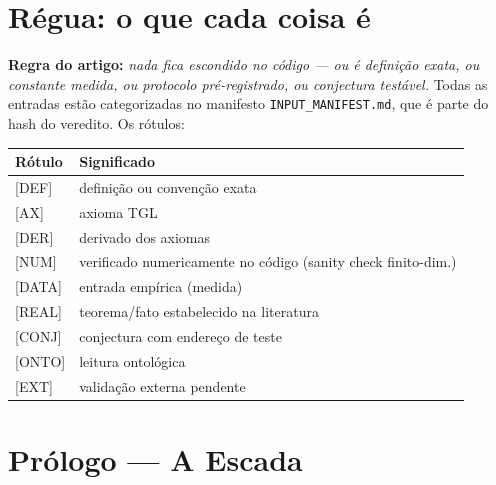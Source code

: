 \documentclass[11pt]{article}
\theoremstyle{definition}\newtheorem{deriv}{Derivação}
\begin{document}
\clearpage\tableofcontents\clearpage

\section*{Régua: o que cada coisa é}

\noindent\textbf{Regra do artigo:} \emph{nada fica escondido no código --- ou é definição exata, ou constante medida, ou protocolo pré-registrado, ou conjectura testável.} Todas as entradas estão categorizadas no manifesto \texttt{INPUT\_MANIFEST.md}, que é parte do hash do veredito. Os rótulos:

\begin{center}\small\begin{tabular}{ll}\toprule

Rótulo & Significado\\\midrule

\textsf{[DEF]} & definição ou convenção exata\\

\textsf{[AX]} & axioma TGL\\

\textsf{[DER]} & derivado dos axiomas\\

\textsf{[NUM]} & verificado numericamente no código (sanity check finito-dim.)\\

\textsf{[DATA]} & entrada empírica (medida)\\

\textsf{[REAL]} & teorema/fato estabelecido na literatura\\

\textsf{[CONJ]} & conjectura com endereço de teste\\

\textsf{[ONTO]} & leitura ontológica\\

\textsf{[EXT]} & validação externa pendente\\\bottomrule

\end{tabular}\end{center}

\section*{Prólogo --- A Escada}
\end{document}
